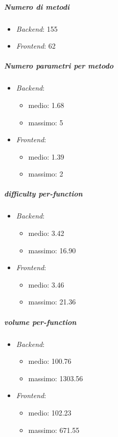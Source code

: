 	\subparagraph{Numero di metodi}
	\begin{itemize}
		\item \emph{Backend}: 155
		\item \emph{Frontend}: 62
	\end{itemize}
	 	

	\subparagraph{Numero parametri per metodo}
	\begin{itemize}
		\item \emph{Backend}: 
		\begin{itemize}
			\item medio: 1.68
			\item massimo: 5
		\end{itemize} 
		\item \emph{Frontend}: 
		\begin{itemize}
			\item medio: 1.39
			\item massimo: 2
		\end{itemize} 
	\end{itemize}


	\subparagraph{ difficulty per-function}
	\begin{itemize}
		\item \emph{Backend}: 
		\begin{itemize}
			\item medio: 3.42
			\item massimo: 16.90
		\end{itemize} 
		\item \emph{Frontend}: 
		\begin{itemize}
			\item medio: 3.46
			\item massimo: 21.36
		\end{itemize} 
	\end{itemize}

	
	\subparagraph{ volume per-function}
	\begin{itemize}
		\item \emph{Backend}: 
		\begin{itemize}
			\item medio: 100.76
			\item massimo: 1303.56
		\end{itemize} 
		\item \emph{Frontend}: 
		\begin{itemize}
			\item medio: 102.23
			\item massimo: 671.55
		\end{itemize} 
	\end{itemize}


